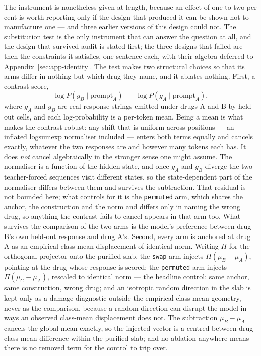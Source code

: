 The instrument is nonetheless given at length, because an effect of one to two per cent is worth
reporting only if the design that produced it can be shown not to manufacture one --- and three
earlier versions of this design could not. The substitution test is the only instrument that can
answer the question at all, and the design that survived
audit is stated first; the three designs that failed are then the constraints it satisfies, one
sentence each, with their algebra deferred to Appendix~\ref{sec:app-identity}. The test makes two
structural choices so that its arms differ in nothing but which drug they name, and it ablates
nothing. First, a contrast score,
\begin{equation}
 \log P\!\left(g_B \mid \textrm{prompt}_A\right) \;-\; \log P\!\left(g_A \mid \textrm{prompt}_A\right),
\end{equation}
where $g_A$ and $g_B$ are real response strings emitted under drugs A and B by held-out cells, and
each log-probability is a per-token mean. Being a mean is what makes the contrast robust: any shift
that is uniform across positions --- an inflated logsumexp normaliser included --- enters both terms
equally and cancels exactly, whatever the two responses are and however many tokens each has. It
does \emph{not} cancel algebraically in the stronger sense one might assume. The normaliser is a
function of the hidden state, and once $g_A$ and $g_B$ diverge the two teacher-forced sequences
visit different states, so the state-dependent part of the normaliser differs between them and
survives the subtraction. That residual is not bounded here; what controls for it is the
\texttt{permuted} arm, which shares the anchor, the construction and the norm and differs only in
naming the wrong drug, so anything the contrast fails to cancel appears in that arm too. What
survives the comparison of the two arms is the model's preference between drug B's own held-out
response and drug A's. Second, every arm is anchored at drug A as an empirical class-mean
displacement of identical norm. Writing $\Pi$ for the orthogonal projector onto the purified slab, the
\texttt{swap} arm injects $\Pi(\mu_B - \mu_A)$, pointing at the drug whose response is scored; the
\texttt{permuted} arm injects $\Pi(\mu_C - \mu_A)$, rescaled to identical norm --- the headline
control: same anchor, same construction, wrong drug; and an isotropic random direction in the slab
is kept only as a damage diagnostic outside the empirical class-mean geometry, never as the
comparison, because a random direction can disrupt the model in ways an observed class-mean
displacement does not. The
subtraction $\mu_B - \mu_A$ cancels the global mean exactly, so the injected vector is a centred
between-drug class-mean difference within the purified slab; and no ablation anywhere means there
is no removed term for the control to trip over.

